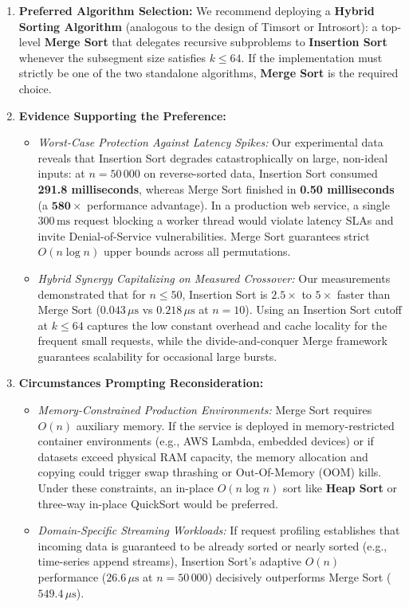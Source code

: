 \documentclass[11pt]{article}
\begin{document}
\begin{enumerate}[itemsep=0.08em, topsep=0.08em]
    \item \textbf{Preferred Algorithm Selection:}
    We recommend deploying a \textbf{Hybrid Sorting Algorithm} (analogous to the design of Timsort or Introsort): a top-level \textbf{Merge Sort} that delegates recursive subproblems to \textbf{Insertion Sort} whenever the subsegment size satisfies $k \le 64$. If the implementation must strictly be one of the two standalone algorithms, \textbf{Merge Sort} is the required choice.

    \item \textbf{Evidence Supporting the Preference:}
    \begin{itemize}[itemsep=0.02em, topsep=0.04em]
        \item \textit{Worst-Case Protection Against Latency Spikes:} Our experimental data reveals that Insertion Sort degrades catastrophically on large, non-ideal inputs: at $n = 50\,000$ on reverse-sorted data, Insertion Sort consumed \textbf{291.8 milliseconds}, whereas Merge Sort finished in \textbf{0.50 milliseconds} (a $\mathbf{580\times}$ performance advantage). In a production web service, a single $300\,\text{ms}$ request blocking a worker thread would violate latency SLAs and invite Denial-of-Service vulnerabilities. Merge Sort guarantees strict $O(n \log n)$ upper bounds across all permutations.
        \item \textit{Hybrid Synergy Capitalizing on Measured Crossover:} Our measurements demonstrated that for $n \le 50$, Insertion Sort is $2.5\times$ to $5\times$ faster than Merge Sort ($0.043\,\mu\text{s}$ vs $0.218\,\mu\text{s}$ at $n=10$). Using an Insertion Sort cutoff at $k \le 64$ captures the low constant overhead and cache locality for the frequent small requests, while the divide-and-conquer Merge framework guarantees scalability for occasional large bursts.
    \end{itemize}

    \item \textbf{Circumstances Prompting Reconsideration:}
    \begin{itemize}[itemsep=0.02em, topsep=0.04em]
        \item \textit{Memory-Constrained Production Environments:} Merge Sort requires $O(n)$ auxiliary memory. If the service is deployed in memory-restricted container environments (e.g., AWS Lambda, embedded devices) or if datasets exceed physical RAM capacity, the memory allocation and copying could trigger swap thrashing or Out-Of-Memory (OOM) kills. Under these constraints, an in-place $O(n \log n)$ sort like \textbf{Heap Sort} or three-way in-place QuickSort would be preferred.
        \item \textit{Domain-Specific Streaming Workloads:} If request profiling establishes that incoming data is guaranteed to be already sorted or nearly sorted (e.g., time-series append streams), Insertion Sort's adaptive $O(n)$ performance ($26.6\,\mu\text{s}$ at $n=50\,000$) decisively outperforms Merge Sort ($549.4\,\mu\text{s}$).
    \end{itemize}


\end{enumerate}
\end{document}
